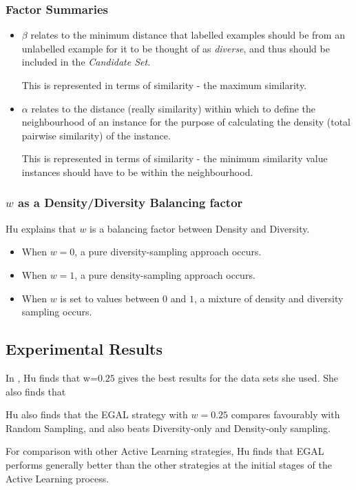 \documentclass[a4paper,11pt]{report}
\begin{document}
\subsubsection{Factor Summaries}
\begin{itemize}
	\item $\beta$ relates to the minimum distance  that labelled examples should be from an unlabelled example for it to be thought of as \emph{diverse}, and thus should be included in the \emph{Candidate Set}.
	
	This is represented in terms of similarity - the maximum similarity.

	\item $\alpha$ relates to the distance (really similarity) within which to define the neighbourhood of an instance for the purpose of calculating the density (total pairwise similarity) of the instance. 
	
	This is represented in terms of similarity - the minimum similarity value instances should have to be within the neighbourhood.
	
\end{itemize}

\subsubsection{$w$ as a Density/Diversity Balancing factor}
Hu explains that $w$ is a balancing factor between Density and Diversity\cite{Hu2010}. 

\begin{itemize}
	\item When $w=0$, a pure diversity-sampling approach occurs. 
	\item When $w=1$, a pure density-sampling approach occurs. 
	\item When $w$ is set to values between $0$ and $1$, a mixture of density and diversity sampling occurs.
\end{itemize}

\subsection{Experimental Results}
In \citet{Hu2011}, Hu finds that w=$0.25$ gives the best results for the data sets she used. She also finds that 

Hu also finds that the EGAL strategy with $w=0.25$ compares favourably with Random Sampling, and also beats Diversity-only and Density-only sampling.

For comparison with other Active Learning strategies, Hu finds that EGAL performs generally better than the other strategies at the initial stages of the Active Learning process.
\end{document}
